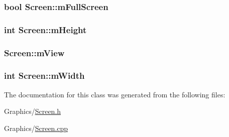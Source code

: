 \subsubsection[{\texorpdfstring{m\+Full\+Screen}{mFullScreen}}]{\setlength{\rightskip}{0pt plus 5cm}bool Screen\+::m\+Full\+Screen\hspace{0.3cm}{\ttfamily [private]}}\hypertarget{classScreen_a21b347af76f1a4e771f6ccf9bc4ad211}{}\label{classScreen_a21b347af76f1a4e771f6ccf9bc4ad211}
\subsubsection[{\texorpdfstring{m\+Height}{mHeight}}]{\setlength{\rightskip}{0pt plus 5cm}int Screen\+::m\+Height\hspace{0.3cm}{\ttfamily [private]}}\hypertarget{classScreen_aaaf507d2c2684413f6803f99b9681de0}{}\label{classScreen_aaaf507d2c2684413f6803f99b9681de0}
\subsubsection[{\texorpdfstring{m\+View}{mView}}]{ Screen\+::m\+View\hspace{0.3cm}{\ttfamily [private]}}\hypertarget{classScreen_a7951477ad349b52b4d58efbc4f86d439}{}\label{classScreen_a7951477ad349b52b4d58efbc4f86d439}
\subsubsection[{\texorpdfstring{m\+Width}{mWidth}}]{\setlength{\rightskip}{0pt plus 5cm}int Screen\+::m\+Width\hspace{0.3cm}{\ttfamily [private]}}\hypertarget{classScreen_ade5c870bad695a69038aea57a9872462}{}\label{classScreen_ade5c870bad695a69038aea57a9872462}


The documentation for this class was generated from the following files\+:\begin{DoxyCompactItemize}
\item 
Graphics/\hyperlink{Screen_8h}{Screen.\+h}\item 
Graphics/\hyperlink{Screen_8cpp}{Screen.\+cpp}\end{DoxyCompactItemize}

